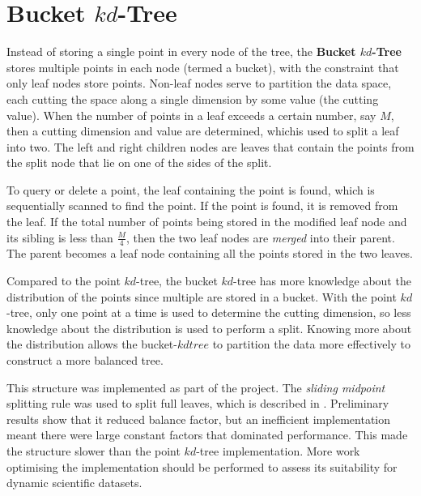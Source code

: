 \section{Bucket $kd$-Tree}

Instead of storing a single point in every node of the tree, the \textbf{Bucket $kd$-Tree} stores multiple points in each node (termed a bucket), with the constraint that only leaf nodes store points. Non-leaf nodes serve to partition the data space, each cutting the space along a single dimension by some value (the cutting value). When the number of points in a leaf exceeds a certain number, say $M$, then a cutting dimension and value are determined, whichis used to split a leaf into two. The left and right children nodes are leaves that contain the points from the split node that lie on one of the sides of the split.

To query or delete a point, the leaf containing the point is found, which is sequentially scanned to find the point. If the point is found, it is removed from the leaf. If the total number of points being stored in the modified leaf node and its sibling is less than $\frac{M}{4}$, then the two leaf nodes are \textit{merged} into their parent. The parent becomes a leaf node containing all the points stored in the two leaves.

Compared to the point $kd$-tree, the bucket $kd$-tree has more knowledge about the distribution of the points since multiple are stored in a bucket. With the point $kd$-tree, only one point at a time is used to determine the cutting dimension, so less knowledge about the distribution is used to perform a split. Knowing more about the distribution allows the bucket-$kdtree$ to partition the data more effectively to construct a more balanced tree.

This structure was implemented as part of the project. The \textit{sliding midpoint} splitting rule was used to split full leaves, which is described in \cite{sliding-midpoint-split}. Preliminary results show that it reduced balance factor, but an inefficient implementation meant there were large constant factors that dominated performance. This made the structure slower than the point $kd$-tree implementation. More work optimising the implementation should be performed to assess its suitability for dynamic scientific datasets.